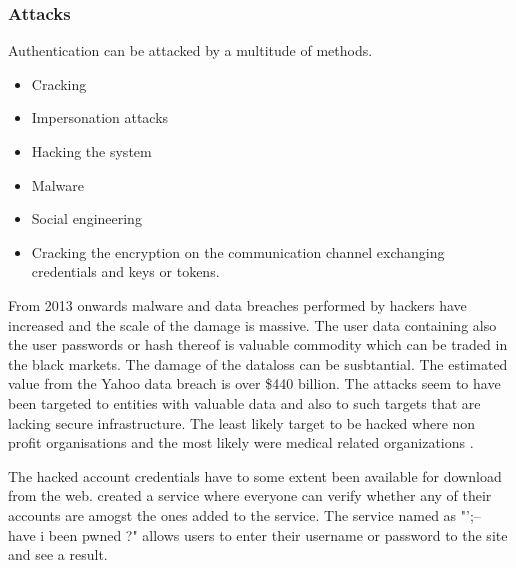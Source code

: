 \begin{sloppypar}
\subsubsection{Attacks}
\begin{sloppypar}
    Authentication can be attacked by a multitude of methods.     
    \begin{itemize}
        \item Cracking
        \item Impersonation attacks
        \item Hacking the system
        \item Malware
        \item Social engineering
        \item Cracking the encryption on the communication channel exchanging credentials and keys or tokens.
    \end{itemize}
\end{sloppypar}
\begin{sloppypar}
    From 2013 onwards malware and data breaches performed by hackers have 
    increased and the scale of the damage is massive. The user data containing 
    also the user passwords or hash thereof is valuable commodity which can be 
    traded in the black markets. The damage of the dataloss can be susbtantial. 
    The estimated value from the Yahoo data breach is over \$440 billion. The 
    attacks seem to have been targeted to entities with valuable data and 
    also to such targets that are lacking secure infrastructure. The least likely 
    target to be hacked where non profit organisations and the most likely were 
    medical related organizations \citep{breach}.
\end{sloppypar}
\begin{sloppypar}
    The hacked account credentials have to some extent been available for download 
    from the web. \citet{pwned} created a service where everyone can verify 
    whether any of their accounts are amogst the ones added to the service. 
    The service named as "';-- have i been pwned ?" allows users to enter their 
    username or password to the site and see a result.
\end{sloppypar}


\end{sloppypar}
